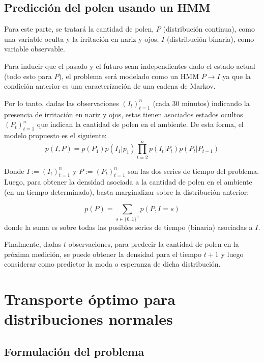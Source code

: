 \documentclass{article}
\begin{document}
\subsection{Predicción del polen usando un HMM}

Para este parte, se tratará la cantidad de polen, $P$ (distribución continua), como una variable oculta y la irritación en nariz y ojos, $I$ (distribución binaria), como variable observable.

Para inducir que el pasado y el futuro sean independientes dado el estado actual (todo esto para $P$), el problema será modelado como un HMM $P\to I$ ya que la condición anterior es una caracterízación de una cadena de Markov.

Por lo tanto, dadas las observaciones $(I_t)_{t=1}^n$ (cada 30 minutos) indicando la presencia de irritación en nariz y ojos, estas tienen asociados estados ocultos $(P_t)_{t=1}^n$ que indican la cantidad de polen en el ambiente. De esta forma, el modelo propuesto es el siguiente:
\begin{equation*}
	p(I,P) = p(P_1)p(I_1|p_1) \prod_{t=2}^n p(I_t|P_t)p(P_t|P_{t-1})
\end{equation*}

Donde $I:=(I_t)_{t=1}^n$ y $P:=(P_t)_{t=1}^n$ son las dos series de tiempo del problema. Luego, para obtener la densidad asociada a la cantidad de polen en el ambiente (en un tiempo determinado), basta marginalizar sobre la distribución anterior:

\begin{equation*}
	p(P) = \sum_{s\in \{0,1\}^n} p(P,I=s)
\end{equation*}
donde la suma es sobre todas las posibles series de tiempo (binaria) asociadas a $I$.

Finalmente, dadas $t$ observaciones, para predecir la cantidad de polen en la próxima medición, se puede obtener la densidad para el tiempo $t+1$ y luego considerar como predictor la moda o esperanza de dicha distribución.

\newpage
\section{Transporte óptimo para distribuciones normales}

\subsection{Formulación del problema}
\end{document}
